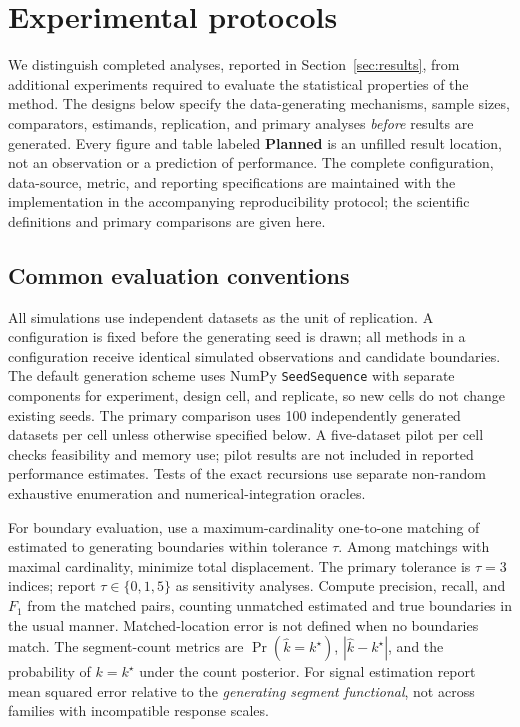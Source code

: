 \section{Experimental protocols}
\label{sec:experimental-design}

We distinguish completed analyses, reported in Section~\ref{sec:results}, from
additional experiments required to evaluate the statistical properties of the
method. The designs below specify the data-generating mechanisms, sample sizes,
comparators, estimands, replication, and primary analyses \emph{before} results
are generated. Every figure and table labeled \textbf{Planned} is an unfilled
result location, not an observation or a prediction of performance. The
complete configuration, data-source, metric, and reporting specifications are
maintained with the implementation in the accompanying reproducibility
protocol; the scientific definitions and primary comparisons are given here.

\subsection{Common evaluation conventions}
\label{subsec:evaluation-conventions}
All simulations use independent datasets as the unit of replication. A
configuration is fixed before the generating seed is drawn; all methods in a
configuration receive identical simulated observations and candidate boundaries.
The default generation scheme uses NumPy \texttt{SeedSequence} with separate
components for experiment, design cell, and replicate, so new cells do not
change existing seeds. The primary comparison uses 100 independently generated
datasets per cell unless otherwise specified below. A five-dataset pilot per
cell checks feasibility and memory use; pilot results are not included in
reported performance estimates. Tests of the exact recursions use separate
non-random exhaustive enumeration and numerical-integration oracles.

For boundary evaluation, use a maximum-cardinality one-to-one matching of
estimated to generating boundaries within tolerance $\tau$. Among matchings
with maximal cardinality, minimize total displacement. The primary tolerance
is $\tau=3$ indices; report $\tau\in\{0,1,5\}$ as sensitivity analyses.
Compute precision, recall, and $F_1$ from the matched pairs, counting unmatched
estimated and true boundaries in the usual manner. Matched-location error is
not defined when no boundaries match. The segment-count metrics are
$\Pr(\widehat k=k^\star)$, $|\widehat k-k^\star|$, and the probability of
$k=k^\star$ under the count posterior. For signal estimation report mean
squared error relative to the \emph{generating segment functional}, not across
families with incompatible response scales.

